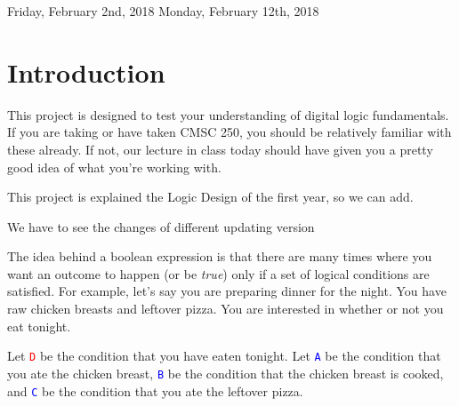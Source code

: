 \documentclass{article}
\begin{document}
\newcommand{\mysubsection}[1]{
    {\fontsize{13}{15}\selectfont\bf \item #1}}
    
\newenvironment{subenv}[1]
{\section{#1}\vspace{.5em}\begin{enumerate}}
{\end{enumerate}}

\newcommand{\varin}[1]{\textcolor{blue}{\texttt{#1}}}
\newcommand{\varout}[1]{\textcolor{red}{\texttt{#1}}}



\large

            {Friday, February 2nd, 2018}
            {Monday, February 12th, 2018}

\section{Introduction}
    \par This project is designed to test your understanding of digital logic fundamentals.  If you are taking or have taken CMSC 250, you should be relatively familiar with these already.  If not, our lecture in class today should have given you a pretty good idea of what you're working with.
    \par This project is explained the Logic Design of the first year, so we can add.
    \par We have to see the changes of different updating version
    
    \par The idea behind a boolean expression is that there are many times where you want an outcome to happen (or be \emph{true}) only if a set of logical conditions are satisfied.  For example, let's say you are preparing dinner for the night.  You have raw chicken breasts and leftover pizza.  You are interested in whether or not you eat tonight.  
    
    \par Let \varout{D} be the condition that you have eaten tonight.  Let \varin{A} be the condition that you ate the chicken breast, \varin{B} be the condition that the chicken breast is cooked, and \varin{C} be the condition that you ate the leftover pizza.
    
\end{document}
